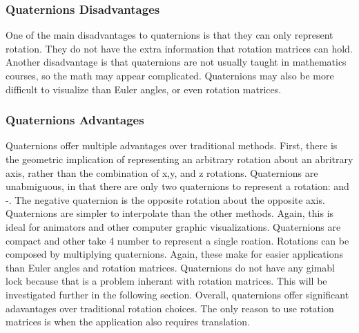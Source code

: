 \subsubsection{Quaternions Disadvantages}
One of the main disadvantages to quaternions is that they can only represent rotation.
They do not have the extra information that rotation matrices can hold.
Another disadvantage is that quaternions are not usually taught in mathematics courses, so the math may appear complicated.
Quaternions may also be more difficult to visualize than Euler angles, or even rotation matrices.
\subsubsection{Quaternions Advantages}
Quaternions offer multiple advantages over traditional methods.
First, there is the geometric implication of representing an arbitrary rotation about an abritrary axis, rather than the combination of x,y, and z rotations.
Quaternions are unabmiguous, in that there are only two quaternions to represent a rotation: \qq and -\qq.
The negative quaternion is the opposite rotation about the opposite axis.
Quaternions are simpler to interpolate than the other methods.
Again, this is ideal for animators and other computer graphic visualizations.
Quaternions are compact and other take 4 number to represent a single roation.
Rotations can be composed by multiplying quaternions.
Again, these make for easier applications than Euler angles and rotation matrices.
Quaternions do not have any gimabl lock because that is a problem inherant with rotation matrices.
This will be investigated further in the following section.
Overall, quaternions offer significant adavantages over traditional rotation choices.
The only reason to use rotation matrices is when the application also requires translation.
